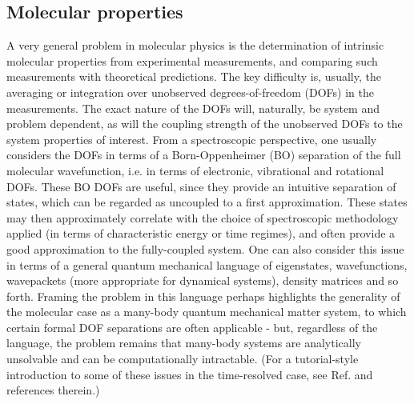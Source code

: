 \documentclass[10pt]{article}
\begin{document}
\subsection{Molecular properties}
A very general problem in molecular physics is the determination of intrinsic molecular properties from experimental measurements, and comparing such measurements with theoretical predictions. The key difficulty is, usually, the averaging or integration over unobserved degrees-of-freedom (DOFs) in the measurements. The exact nature of the DOFs will, naturally, be system and problem dependent, as will the coupling strength of the unobserved DOFs to the system properties of interest. From a spectroscopic perspective, one usually considers the DOFs in terms of a Born-Oppenheimer (BO) separation of the full molecular wavefunction, i.e. in terms of electronic, vibrational and rotational DOFs. These BO DOFs are useful, since they provide an intuitive separation of states, which can be regarded as uncoupled to a first approximation. These states may then approximately correlate with the choice of spectroscopic methodology applied (in terms of characteristic energy or time regimes), and often provide a good approximation to the fully-coupled system. One can also consider this issue in terms of a general quantum mechanical language of eigenstates, wavefunctions, wavepackets (more appropriate for dynamical systems), density matrices and so forth. Framing the problem in this language perhaps highlights the generality of the molecular case as a many-body quantum mechanical matter system, to which certain formal DOF separations are often applicable - but, regardless of the language, the problem remains that many-body systems are analytically unsolvable and can be computationally intractable. 
(For a tutorial-style introduction to some of these issues in the time-resolved case, see Ref. \cite{wu2011TimeresolvedPhotoelectronSpectroscopy} and references therein.) %
\end{document}
